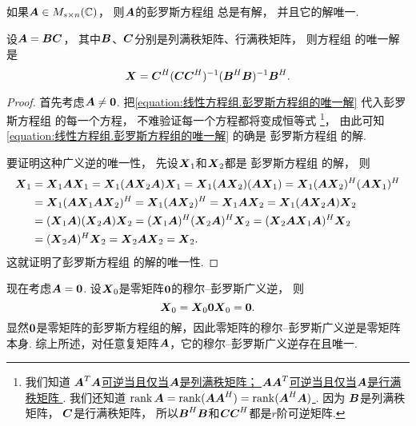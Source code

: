 \begin{theorem}[穆尔--彭罗斯广义逆的唯一性]\label{theorem:线性方程组.穆尔--彭罗斯广义逆的唯一性}
如果\(\boldsymbol{A} \in M_{s \times n}(\mathbb{C})\)，
则\(\boldsymbol{A}\)的彭罗斯方程组  总是有解，
并且它的解唯一.

设\(\boldsymbol{A} = \boldsymbol{B} \boldsymbol{C}\)，
其中\(\boldsymbol{B}\)、\(\boldsymbol{C}\)分别是列满秩矩阵、行满秩矩阵，
则方程组  的唯一解是
\begin{equation}\label{equation:线性方程组.彭罗斯方程组的唯一解}
	\boldsymbol{X} = \boldsymbol{C}^H (\boldsymbol{C} \boldsymbol{C}^H)^{-1} (\boldsymbol{B}^H \boldsymbol{B})^{-1} \boldsymbol{B}^H.
\end{equation}
\begin{proof}
首先考虑\(\boldsymbol{A}\neq\boldsymbol0\).
把\cref{equation:线性方程组.彭罗斯方程组的唯一解}
代入彭罗斯方程组  的每一个方程，
不难验证每一个方程都将变成恒等式
\footnote{
	我们知道 \hyperref[example:齐次线性方程组的解集的结构.矩阵及其转置的乘积可逆的充分必要条件]{
		\(\boldsymbol{A}^T \boldsymbol{A}\)可逆当且仅当\(\boldsymbol{A}\)是列满秩矩阵；
		\(\boldsymbol{A} \boldsymbol{A}^T\)可逆当且仅当\(\boldsymbol{A}\)是行满秩矩阵
	}.
	我们还知道 \hyperref[equation:矩阵乘积的秩.复矩阵及其共轭转置矩阵的乘积的秩]{
		\(
			\rank\boldsymbol{A}
			=\allowbreak
			\rank(\boldsymbol{A} \boldsymbol{A}^H)
			=\allowbreak
			\rank(\boldsymbol{A}^H \boldsymbol{A})
		\)
	}.
	因为
		\(\boldsymbol{B}\)是列满秩矩阵，
		\(\boldsymbol{C}\)是行满秩矩阵，
	所以\(\boldsymbol{B}^H \boldsymbol{B}\)和\(\boldsymbol{C} \boldsymbol{C}^H\)都是\(r\)阶可逆矩阵.
}，
由此可知\cref{equation:线性方程组.彭罗斯方程组的唯一解} 的确是
彭罗斯方程组  的解.

要证明这种广义逆的唯一性，
先设\(\boldsymbol{X}_1\)和\(\boldsymbol{X}_2\)都是
彭罗斯方程组  的解，
则\begin{align*}
	\boldsymbol{X}_1
	&= \boldsymbol{X}_1\boldsymbol{A} \boldsymbol{X}_1
	= \boldsymbol{X}_1(\boldsymbol{A} \boldsymbol{X}_2\boldsymbol{A})\boldsymbol{X}_1
	= \boldsymbol{X}_1(\boldsymbol{A} \boldsymbol{X}_2)(\boldsymbol{A} \boldsymbol{X}_1)
	= \boldsymbol{X}_1(\boldsymbol{A} \boldsymbol{X}_2)^H(\boldsymbol{A} \boldsymbol{X}_1)^H \\
	&= \boldsymbol{X}_1(\boldsymbol{A} \boldsymbol{X}_1\boldsymbol{A} \boldsymbol{X}_2)^H
	= \boldsymbol{X}_1(\boldsymbol{A} \boldsymbol{X}_2)^H
	= \boldsymbol{X}_1\boldsymbol{A} \boldsymbol{X}_2
	= \boldsymbol{X}_1(\boldsymbol{A} \boldsymbol{X}_2\boldsymbol{A})\boldsymbol{X}_2 \\
	&= (\boldsymbol{X}_1\boldsymbol{A})(\boldsymbol{X}_2\boldsymbol{A})\boldsymbol{X}_2
	= (\boldsymbol{X}_1\boldsymbol{A})^H(\boldsymbol{X}_2\boldsymbol{A})^H\boldsymbol{X}_2
	= (\boldsymbol{X}_2\boldsymbol{A} \boldsymbol{X}_1\boldsymbol{A})^H \boldsymbol{X}_2 \\
	&= (\boldsymbol{X}_2\boldsymbol{A})^H \boldsymbol{X}_2
	= \boldsymbol{X}_2\boldsymbol{A} \boldsymbol{X}_2
	= \boldsymbol{X}_2.
\end{align*}
这就证明了彭罗斯方程组  的解的唯一性.
\end{proof}
\end{theorem}
\begin{remark}
现在考虑\(\boldsymbol{A} = \boldsymbol0\).
设\(\boldsymbol{X}_0\)是零矩阵\(\boldsymbol0\)的穆尔--彭罗斯广义逆，
则\begin{equation*}
	\boldsymbol{X}_0 = \boldsymbol{X}_0 \boldsymbol0 \boldsymbol{X}_0 = \boldsymbol0.
\end{equation*}
显然\(\boldsymbol0\)是零矩阵的彭罗斯方程组的解，因此零矩阵的穆尔--彭罗斯广义逆是零矩阵本身.
综上所述，对任意复矩阵\(\boldsymbol{A}\)，它的穆尔--彭罗斯广义逆存在且唯一.
\end{remark}
